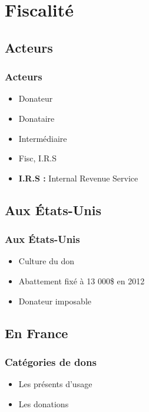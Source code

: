     \section{Fiscalité}

    \subsection{Acteurs}


\begin{frame}
\frametitle{Acteurs}

\begin{itemize}
    \itemsep1.5em
    \item Donateur
    \item Donataire
    \item Intermédiaire
    \item Fisc, I.R.S
    \item \textbf{I.R.S :} Internal Revenue Service
\end{itemize}
\end{frame}


    \subsection{Aux États-Unis}

\begin{frame}
\frametitle{Aux États-Unis}

\begin{itemize}
    \itemsep1.5em
    \item Culture du don
    \item Abattement fixé à 13 000\${} en 2012
    \item Donateur imposable
\end{itemize}
\end{frame}


    \subsection{En France}


\begin{frame}
\frametitle{Catégories de dons}

\begin{itemize}
    \itemsep1.5em
    \item Les présents d'usage
    \item Les donations
\end{itemize}
\end{frame}


